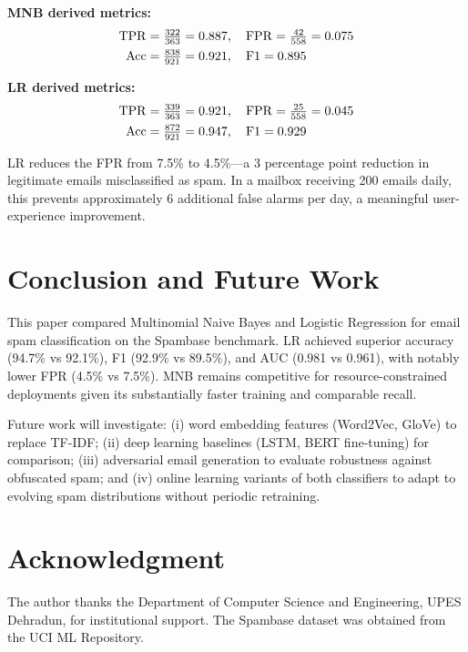 \documentclass[conference,letterpaper]{IEEEtran}
\begin{document}
\noindent\textbf{MNB derived metrics:}
\begin{align}
\mathrm{TPR} &= \tfrac{322}{363} = 0.887, \quad \mathrm{FPR} = \tfrac{42}{558} = 0.075 \notag\\
\mathrm{Acc} &= \tfrac{838}{921} = 0.921, \quad \mathrm{F1} = 0.895 \notag
\end{align}

\noindent\textbf{LR derived metrics:}
\begin{align}
\mathrm{TPR} &= \tfrac{339}{363} = 0.921, \quad \mathrm{FPR} = \tfrac{25}{558} = 0.045 \notag\\
\mathrm{Acc} &= \tfrac{872}{921} = 0.947, \quad \mathrm{F1} = 0.929 \notag
\end{align}

LR reduces the FPR from 7.5\% to 4.5\%---a 3 percentage point reduction in legitimate emails
misclassified as spam. In a mailbox receiving 200 emails daily, this prevents approximately 6
additional false alarms per day, a meaningful user-experience improvement.

\section{Conclusion and Future Work}
\label{sec:conclusion}

This paper compared Multinomial Naive Bayes and Logistic Regression for email spam classification
on the Spambase benchmark. LR achieved superior accuracy (94.7\% vs 92.1\%), F1 (92.9\% vs 89.5\%),
and AUC (0.981 vs 0.961), with notably lower FPR (4.5\% vs 7.5\%). MNB remains competitive for
resource-constrained deployments given its substantially faster training and comparable recall.

Future work will investigate: (i) word embedding features (Word2Vec, GloVe) to replace TF-IDF;
(ii) deep learning baselines (LSTM, BERT fine-tuning) for comparison; (iii) adversarial email
generation to evaluate robustness against obfuscated spam; and (iv) online learning variants of
both classifiers to adapt to evolving spam distributions without periodic retraining.

\section*{Acknowledgment}
The author thanks the Department of Computer Science and Engineering, UPES Dehradun, for
institutional support. The Spambase dataset was obtained from the UCI ML Repository.
\end{document}
